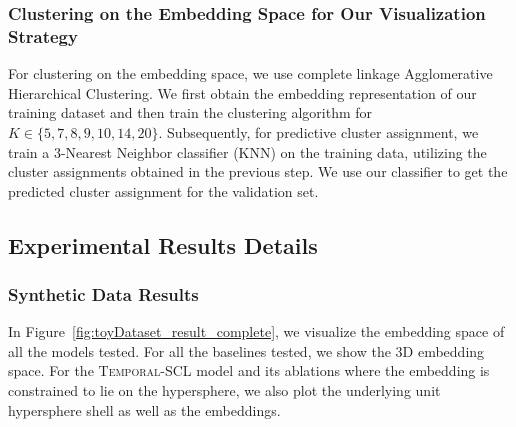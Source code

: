 \documentclass[pmlr,twocolumn,10pt]{jmlr} %
\begin{document}
\subsubsection{Clustering on the Embedding Space for Our Visualization Strategy}
\label{sec:cluster}
For clustering on the embedding space, we use complete linkage Agglomerative Hierarchical Clustering. 
We first obtain the embedding representation of our training dataset and then train the clustering algorithm for $K\in\{5,7,8,9,10,14,20\}$. 
Subsequently, for predictive cluster assignment, we train a 3-Nearest Neighbor classifier (KNN) on the training data, utilizing the cluster assignments obtained in the previous step.
We use our classifier to get the predicted cluster assignment for the validation set. 


\subsection{Experimental Results Details}
\label{sec:experimental-results-details}
\subsubsection{Synthetic Data Results}
\label{sec:ToyExperiment_Results}

In Figure~\ref{fig:toyDataset_result_complete}, we visualize the embedding space of all the models tested. For all the baselines tested, we show the 3D embedding space. For the \textsc{Temporal-SCL} model and its ablations where the embedding is constrained to lie on the hypersphere, we also plot the underlying unit hypersphere shell as well as the embeddings.
\end{document}
